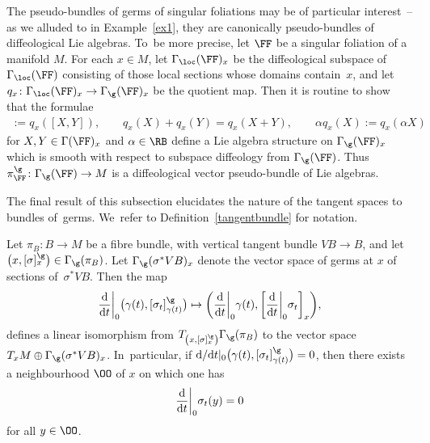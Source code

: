 \begin{Remark}
The pseudo-bundles of germs of singular foliations may be of particular interest~-- as we alluded to in Example~\ref{ex1}, they are canonically pseudo-bundles of diffeological Lie algebras. To~be more precise, let $\FF$ be a singular foliation of a manifold $M$. For each $x\in M$, let $\Gamma_{\loc}(\FF)_{x}$ be the diffeological subspace of $\Gamma_{\loc}(\FF)$ consisting of those local sections whose domains con\-tain~$x$, and let $q_{x}\colon \Gamma_{\loc}(\FF)_{x}\rightarrow\Gamma_{\g}(\FF)_{x}$ be the quotient map. Then it is routine to show that the formulae
\begin{gather*}
[q_{x}(X),q_{x}(Y)]:=q_{x}([X,Y]),\qquad
q_{x}(X)+q_{x}(Y) =q_{x}(X+Y),\qquad
\alpha q_{x}(X):=q_{x}(\alpha X)
\end{gather*}
for $X,Y\in\Gamma(\FF)_{x}$ and $\alpha\in\RB$ define a Lie algebra structure on $\Gamma_{\g}(\FF)_{x}$ which is smooth with respect to subspace diffeology from $\Gamma_{\g}(\FF)$. Thus $\pi_{\FF}^{\g}\colon \Gamma_{\g}(\FF)\rightarrow M$ is a diffeological vector pseudo-bundle of Lie algebras.
\end{Remark}

The final result of this subsection elucidates the nature of the tangent spaces to bundles of~germs. We~refer to Definition~\ref{tangentbundle} for notation.

\begin{Proposition}\label{tangentgerm}
Let $\pi_{B}\colon B\rightarrow M$ be a fibre bundle, with vertical tangent bundle $VB\rightarrow B$, and let $\big(x,[\sigma]^{\g}_{x}\big)\in\Gamma_{\g}(\pi_{B})$. Let $\Gamma_{\g}(\sigma^{*}VB)_{x}$ denote the vector space of germs at $x$ of sections of~$\sigma^{*}VB$. Then the map
\begin{gather}\label{tangerm}
\frac{\rm d}{{\rm d}t}\bigg|_{0}\big(\gamma(t),[\sigma_{t}]^{\g}_{\gamma(t)}\big) \mapsto \bigg(\frac{\rm d}{{\rm d}t}\bigg|_{0}\gamma(t),\bigg[\frac{\rm d}{{\rm d}t}\bigg|_{0}\sigma_{t}\bigg]_{x}\bigg),
\end{gather}
defines a linear isomorphism from $T_{\left(x,[\sigma]^{\g}_{x}\right)}\Gamma_{\g}(\pi_{B})$ to the vector space $T_{x}M\oplus\Gamma_{\g}(\sigma^{*}VB)_{x}$. In~particular, if ${\rm d}/{\rm d}t|_{0}\big(\gamma(t),[\sigma_{t}]^{\g}_{\gamma(t)}\big) = 0$, then there exists a neighbourhood $\OO$ of $x$ on which one has
\begin{gather*}
\frac{\rm d}{{\rm d}t}\bigg|_{0}\sigma_{t}(y) = 0
\end{gather*}
for all $y\in\OO$.
\end{Proposition}

